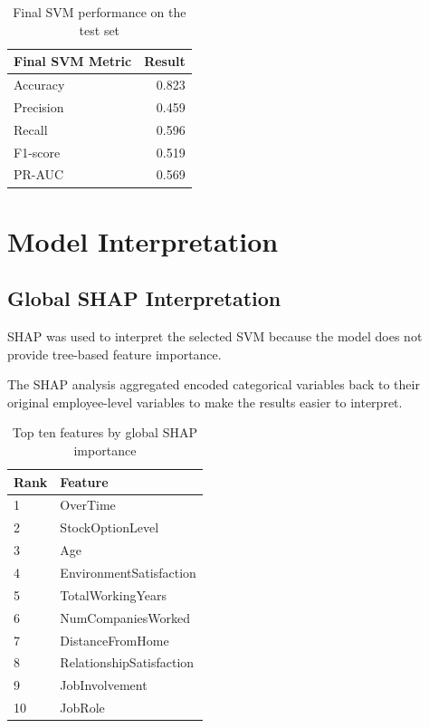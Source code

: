 \documentclass[11pt]{article}
\begin{document}
\begin{table}[H]
\centering
\begin{tabular}{lr}
\toprule
\textbf{Final SVM Metric} & \textbf{Result} \\
\midrule
Accuracy & 0.823 \\
Precision & 0.459 \\
Recall & 0.596 \\
F1-score & 0.519 \\
PR-AUC & 0.569 \\
\bottomrule
\end{tabular}
\caption{Final SVM performance on the test set}
\end{table}

\section{Model Interpretation}

\subsection{Global SHAP Interpretation}

SHAP was used to interpret the selected SVM because the model does not provide tree-based feature importance.

The SHAP analysis aggregated encoded categorical variables back to their original employee-level variables to make the results easier to interpret.



\begin{table}[H]
\centering
\begin{tabular}{ll}
\toprule
\textbf{Rank} & \textbf{Feature} \\
\midrule
1  & OverTime \\
2  & StockOptionLevel \\
3  & Age \\
4  & EnvironmentSatisfaction \\
5  & TotalWorkingYears \\
6  & NumCompaniesWorked \\
7  & DistanceFromHome \\
8  & RelationshipSatisfaction \\
9  & JobInvolvement \\
10 & JobRole \\
\bottomrule
\end{tabular}
\caption{Top ten features by global SHAP importance}
\end{table}
\end{document}
